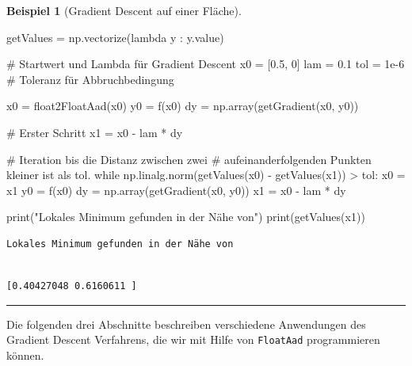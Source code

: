 \documentclass[
  a4paper,
  DIV=11]{scrreprt}
\newenvironment{Shaded}{\begin{snugshade}}{\end{snugshade}}
\newcommand{\BuiltInTok}[1]{\textcolor[rgb]{0.00,0.23,0.31}{#1}}
\newcommand{\CommentTok}[1]{\textcolor[rgb]{0.37,0.37,0.37}{#1}}
\newcommand{\ControlFlowTok}[1]{\textcolor[rgb]{0.00,0.23,0.31}{#1}}
\newcommand{\DecValTok}[1]{\textcolor[rgb]{0.68,0.00,0.00}{#1}}
\newcommand{\FloatTok}[1]{\textcolor[rgb]{0.68,0.00,0.00}{#1}}
\newcommand{\KeywordTok}[1]{\textcolor[rgb]{0.00,0.23,0.31}{#1}}
\newcommand{\NormalTok}[1]{\textcolor[rgb]{0.00,0.23,0.31}{#1}}
\newcommand{\OperatorTok}[1]{\textcolor[rgb]{0.37,0.37,0.37}{#1}}
\newcommand{\StringTok}[1]{\textcolor[rgb]{0.13,0.47,0.30}{#1}}
\theoremstyle{definition}
\theoremstyle{definition}
\newtheorem{example}{Beispiel}[chapter]
\theoremstyle{remark}
\begin{document}
\begin{example}[Gradient Descent auf einer
Fläche]
\begin{Shaded}
\begin{Highlighting}[]
\NormalTok{getValues }\OperatorTok{=}\NormalTok{ np.vectorize(}\KeywordTok{lambda}\NormalTok{ y : y.value)}

\CommentTok{\# Startwert und Lambda für Gradient Descent}
\NormalTok{x0 }\OperatorTok{=}\NormalTok{ [}\FloatTok{0.5}\NormalTok{, }\DecValTok{0}\NormalTok{]}
\NormalTok{lam }\OperatorTok{=} \FloatTok{0.1}
\NormalTok{tol }\OperatorTok{=} \FloatTok{1e{-}6} \CommentTok{\# Toleranz für Abbruchbedingung}

\NormalTok{x0 }\OperatorTok{=}\NormalTok{ float2FloatAad(x0)}
\NormalTok{y0 }\OperatorTok{=}\NormalTok{ f(x0)}
\NormalTok{dy }\OperatorTok{=}\NormalTok{ np.array(getGradient(x0, y0))}

\CommentTok{\# Erster Schritt}
\NormalTok{x1 }\OperatorTok{=}\NormalTok{ x0 }\OperatorTok{{-}}\NormalTok{ lam }\OperatorTok{*}\NormalTok{ dy}

\CommentTok{\# Iteration bis die Distanz zwischen zwei}
\CommentTok{\# aufeinanderfolgenden Punkten kleiner ist als tol.}
\ControlFlowTok{while}\NormalTok{ np.linalg.norm(getValues(x0) }\OperatorTok{{-}}\NormalTok{ getValues(x1)) }\OperatorTok{\textgreater{}}\NormalTok{ tol:}
\NormalTok{    x0 }\OperatorTok{=}\NormalTok{ x1}
\NormalTok{    y0 }\OperatorTok{=}\NormalTok{ f(x0)}
\NormalTok{    dy }\OperatorTok{=}\NormalTok{ np.array(getGradient(x0, y0))}
\NormalTok{    x1 }\OperatorTok{=}\NormalTok{ x0 }\OperatorTok{{-}}\NormalTok{ lam }\OperatorTok{*}\NormalTok{ dy}

\BuiltInTok{print}\NormalTok{(}\StringTok{"Lokales Minimum gefunden in der Nähe von"}\NormalTok{)}
\BuiltInTok{print}\NormalTok{(getValues(x1))}
\end{Highlighting}
\end{Shaded}

\begin{verbatim}
Lokales Minimum gefunden in der Nähe von
\end{verbatim}

\begin{verbatim}

[0.40427048 0.6160611 ]
\end{verbatim}

\end{example}

\begin{center}\rule{0.5\linewidth}{0.5pt}\end{center}

Die folgenden drei Abschnitte beschreiben verschiedene Anwendungen des
Gradient Descent Verfahrens, die wir mit Hilfe von \texttt{FloatAad}
programmieren können.
\end{document}
